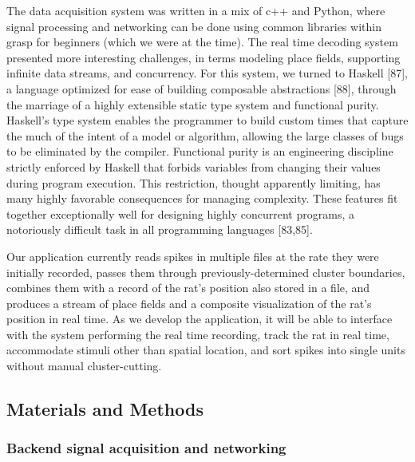 \documentclass[]{article}
\begin{document}
The data acquisition system was written in a mix of c++ and Python,
where signal processing and networking can be done using common
libraries within grasp for beginners (which we were at the time). The
real time decoding system presented more interesting challenges, in
terms modeling place fields, supporting infinite data streams, and
concurrency. For this system, we turned to Haskell {[}87{]}, a language
optimized for ease of building composable abstractions {[}88{]}, through
the marriage of a highly extensible static type system and functional
purity. Haskell's type system enables the programmer to build custom
times that capture the much of the intent of a model or algorithm,
allowing the large classes of bugs to be eliminated by the compiler.
Functional purity is an engineering discipline strictly enforced by
Haskell that forbids variables from changing their values during program
execution. This restriction, thought apparently limiting, has many
highly favorable consequences for managing complexity. These features
fit together exceptionally well for designing highly concurrent
programs, a notoriously difficult task in all programming languages
{[}83,85{]}.

Our application currently reads spikes in multiple files at the rate
they were initially recorded, passes them through previously-determined
cluster boundaries, combines them with a record of the rat's position
also stored in a file, and produces a stream of place fields and a
composite visualization of the rat's position in real time. As we
develop the application, it will be able to interface with the system
performing the real time recording, track the rat in real time,
accommodate stimuli other than spatial location, and sort spikes into
single units without manual cluster-cutting.

\subsection{Materials and Methods}

\subsubsection{Backend signal acquisition and networking}
\end{document}
